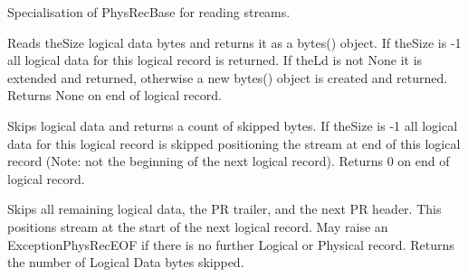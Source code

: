 \documentclass[letterpaper,10pt,english]{sphinxmanual}
\begin{document}
\begin{fulllineitems}
\label{\detokenize{ref/LIS/core/PhysRec:TotalDepth.LIS.core.PhysRec.PhysRecRead}}
Specialisation of PhysRecBase for reading streams.

\begin{fulllineitems}
\label{\detokenize{ref/LIS/core/PhysRec:TotalDepth.LIS.core.PhysRec.PhysRecRead.readLrBytes}}
Reads theSize logical data bytes and returns it as a bytes() object.
If theSize is -1 all logical data for this logical record is returned.
If theLd is not None it is extended and returned, otherwise a new
bytes() object is created and returned.
Returns None on end of logical record.

\end{fulllineitems}


\begin{fulllineitems}
\label{\detokenize{ref/LIS/core/PhysRec:TotalDepth.LIS.core.PhysRec.PhysRecRead.skipLrBytes}}
Skips logical data and returns a count of skipped bytes.
If theSize is -1 all logical data for this logical record is skipped
positioning the stream at end of this logical record (Note: not the 
beginning of the next logical record).
Returns 0 on end of logical record.

\end{fulllineitems}


\begin{fulllineitems}
\label{\detokenize{ref/LIS/core/PhysRec:TotalDepth.LIS.core.PhysRec.PhysRecRead.skipToNextLr}}
Skips all remaining logical data, the PR trailer, and the next PR
header. This positions stream at the start of the next logical record.
May raise an ExceptionPhysRecEOF if there is no further Logical or
Physical record.
Returns the number of Logical Data bytes skipped.


\end{fulllineitems}
\end{fulllineitems}
\end{document}
